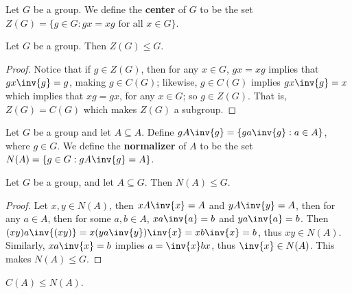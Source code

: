 \begin{definition}
    Let $G$ be a group. We define the  \textbf{center} of $G$ to be the set
    $Z(G)=\{g \in G : gx=xg \text{ for all } x \in G\}$.
\end{definition}

\begin{lemma}\label{2.2.2}
    Let  $G$ be a group. Then  $Z(G) \leq G$.
\end{lemma}
\begin{proof}
    Notice that if $g \in Z(G)$, then for any $x \in G$, $gx=xg$ implies that
    $gx\inv{g}=g$, making $g \in C(G)$; likewise, $g \in C(G)$ implies
    $gx\inv{g}=x$ which implies that $xg=gx$, for any  $x \in G$; so  $g \in
    Z(G)$. That is, $Z(G)=C(G)$ which makes $Z(G)$ a subgroup.
\end{proof}

\begin{definition}
    Let $G$ be a group and let  $A \subseteq A$. Define $gA\inv{g}=\{ga\inv{g} :
    a \in A\}$, where $g \in G$. We define the \textbf{normalizer} of $A$ to be
    the set  $N(A)=\{g \in G : gA\inv{g}=A\}$.
\end{definition}

\begin{lemma}\label{2.2.3}
    Let $G$ be a group, and let  $A \subseteq G$. Then  $N(A) \leq G$.
\end{lemma}
\begin{proof}
    Let $x,y \in N(A)$, then $xA\inv{x}=A$ and $yA\inv{y}=A$, then for any  $a
    \in A$, then for some $a,b \in A$, $xa\inv{a}=b$ and $ya\inv{a}=b$. Then
    $(xy)a\inv{(xy)}=x(ya\inv{y})\inv{x}=xb\inv{x}=b$, thus $xy \in N(A)$.
    Similarly, $xa\inv{x}=b$ implies $a=\inv{x}bx$, thus $\inv{x} \in N(A)$.
    This makes $N(A) \leq G$.
\end{proof}
\begin{corollary}
    $C(A) \leq N(A)$.
\end{corollary}

